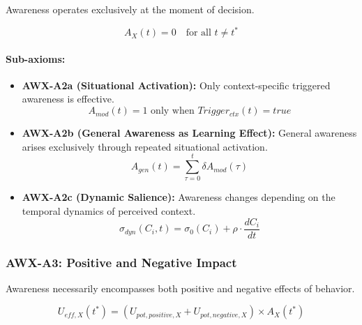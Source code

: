 \begin{axiom}
\label{ax:awx-a2}
Awareness operates exclusively at the moment of decision.
\end{axiom}

\begin{equation}
A_X(t) = 0 \quad \text{for all } t \neq t^*
\end{equation}

\paragraph{Sub-axioms:}

\begin{itemize}
\item \textbf{AWX-A2a (Situational Activation):} Only context-specific triggered 
awareness is effective.
\begin{equation}
A_{mod}(t) = 1 \text{ only when } Trigger_{ctx}(t) = true
\end{equation}

\item \textbf{AWX-A2b (General Awareness as Learning Effect):} General awareness 
arises exclusively through repeated situational activation.
\begin{equation}
A_{gen}(t) = \sum_{\tau=0}^{t} \delta A_{mod}(\tau)
\end{equation}

\item \textbf{AWX-A2c (Dynamic Salience):} Awareness changes depending on the 
temporal dynamics of perceived context.
\begin{equation}
\sigma_{dyn}(C_i, t) = \sigma_0(C_i) + \rho \cdot \frac{dC_i}{dt}
\end{equation}
\end{itemize}

\subsubsection{AWX-A3: Positive and Negative Impact}

\begin{axiom}
\label{ax:awx-a3}
Awareness necessarily encompasses both positive and negative effects of behavior.
\end{axiom}

\begin{equation}
U_{eff,X}(t^*) = (U_{pot,positive,X} + U_{pot,negative,X}) \times A_X(t^*)
\end{equation}

